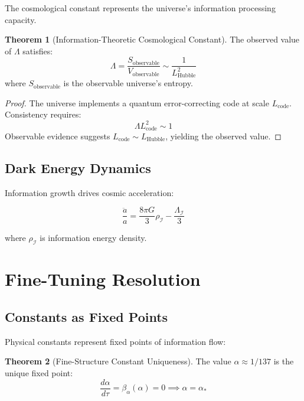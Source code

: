 \documentclass[11pt,a4paper]{article}
\theoremstyle{definition}
\newtheorem{theorem}{Theorem}[section]
\begin{document}
The cosmological constant represents the universe's information processing capacity.

\begin{theorem}[Information-Theoretic Cosmological Constant]
The observed value of $\Lambda$ satisfies:
\begin{equation}
\Lambda = \frac{S_{\text{observable}}}{V_{\text{observable}}} \sim \frac{1}{L_{\text{Hubble}}^2}
\end{equation}
where $S_{\text{observable}}$ is the observable universe's entropy.
\end{theorem}

\begin{proof}
The universe implements a quantum error-correcting code at scale $L_{\text{code}}$. Consistency requires:
\[\Lambda L_{\text{code}}^2 \sim 1\]
Observable evidence suggests $L_{\text{code}} \sim L_{\text{Hubble}}$, yielding the observed value.
\end{proof}

\subsection{Dark Energy Dynamics}

Information growth drives cosmic acceleration:

\begin{equation}
\frac{\ddot{a}}{a} = \frac{8\pi G}{3}\rho_{\mathcal{I}} - \frac{\Lambda_{\mathcal{I}}}{3}
\end{equation}

where $\rho_{\mathcal{I}}$ is information energy density.

\section{Fine-Tuning Resolution}

\subsection{Constants as Fixed Points}

Physical constants represent fixed points of information flow:

\begin{theorem}[Fine-Structure Constant Uniqueness]
The value $\alpha \approx 1/137$ is the unique fixed point:
\begin{equation}
\frac{d\alpha}{d\tau} = \beta_\alpha(\alpha) = 0 \implies \alpha = \alpha_*
\end{equation}
\end{theorem}
\end{document}
